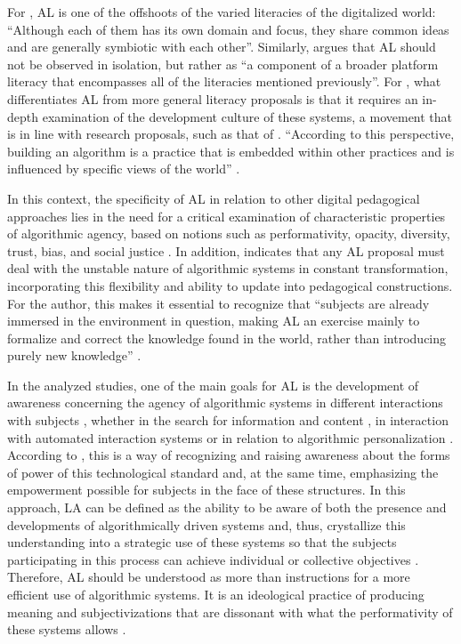 For \textcite[p. 3]{Ridley2021}, AL is one of the offshoots of the varied literacies of the digitalized world: “Although each of them has its own domain and focus, they share common ideas and are generally symbiotic with each other”. Similarly, \textcite[p. 30]{Devito2021} argues that AL should not be observed in isolation, but rather as “a component of a broader platform literacy that encompasses all of the literacies mentioned previously”. For \textcite{Lloyd2019}, what differentiates AL from more general literacy proposals is that it requires an in-depth examination of the development culture of these systems, a movement that is in line with research proposals, such as that of \textcite{Seaver2017}. “According to this perspective, building an algorithm is a practice that is embedded within other practices and is influenced by specific views of the world” \cite[p. 1483]{Lloyd2019}.

In this context, the specificity of AL in relation to other digital pedagogical approaches lies in the need for a critical examination of characteristic properties of algorithmic agency, based on notions such as performativity, opacity, diversity, trust, bias, and social justice \cite{Lloyd2019}. In addition, \textcite{Devito2021} indicates that any AL proposal must deal with the unstable nature of algorithmic systems in constant transformation, incorporating this flexibility and ability to update into pedagogical constructions. For the author, this makes it essential to recognize that “subjects are already immersed in the environment in question, making AL an exercise mainly to formalize and correct the knowledge found in the world, rather than introducing purely new knowledge” \cite[p. 3-4]{Devito2021}.

In the analyzed studies, one of the main goals for AL is the development of awareness concerning the agency of algorithmic systems in different interactions with subjects \cite{Bakke2020}, whether in the search for information and content \cite{Kampa2021}, in interaction with automated interaction systems \cite{Shin2022} or in relation to algorithmic personalization \cite{Devito2021,Lv2022,Bell2023}. According to \textcite{Ridley2021}, this is a way of recognizing and raising awareness about the forms of power of this technological standard and, at the same time, emphasizing the empowerment possible for subjects in the face of these structures. In this approach, LA can be defined as the ability to be aware of both the presence and developments of algorithmically driven systems and, thus, crystallize this understanding into a strategic use of these systems so that the subjects participating in this process can achieve individual or collective objectives \cite{Devito2021}. Therefore, AL should be understood as more than instructions for a more efficient use of algorithmic systems. It is an ideological practice of producing meaning and subjectivizations that are dissonant with what the performativity of these systems allows \cite{Ridley2021}.

